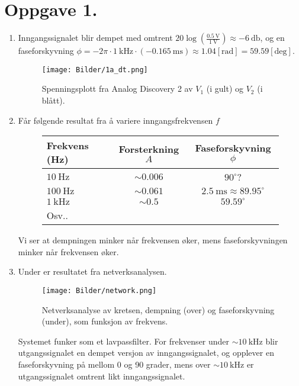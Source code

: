 \documentclass[a4paper,11pt,norsk]{article}
\begin{document}


\section*{Oppgave 1.}
\begin{enumerate}
    \item {
        Inngangssignalet blir dempet med omtrent $20\log{\left(\frac{\SI{0.5}{\volt}}{\SI{1}{\volt}}\right)} \approx \SI{-6}{\decibel}$, og 
        en faseforskyvning $\phi = -2\pi \cdot \SI{1}{\kilo\hertz} \cdot (-\SI{0.165}{\milli\s}) \approx 1.04[\text{rad}] = 59.59[\text{deg}]$.
     
        \begin{figure}[H]
            \centering
            \texttt{[image: Bilder/1a\_dt.png]}
            \caption{Spenningsplott fra Analog Discovery 2 av $V_1$ (i gult) og $V_2$ (i blått).}
        \end{figure}
    }
    \item {
        Får følgende resultat fra å variere inngangsfrekvensen $f$
        \begin{figure}[H]
            \centering
            \begin{tabular}{| l | c | c |}
                \hline
                Frekvens (Hz) & Forsterkning $A$ & Faseforskyvning $\phi$ \\
                \hline
                $\SI{10}{\hertz}$ & $\sim 0.006$ & $90^{\circ}$? \\ 
                \hline
                $\SI{100}{\hertz}$ & $\sim 0.061$ & $\SI{2.5}{\milli\s} \approx 89.95^{\circ}$\\ 
                \hline
                $\SI{1}{\kilo\hertz}$ & $\sim 0.5$ & $59.59^{\circ}$ \\ 
                \hline
                Osv.. & & \\
                \hline
            \end{tabular} 
        \end{figure}

        Vi ser at dempningen minker når frekvensen øker, mens faseforskyvningen minker når frekvensen øker.
    }
    \item {
        Under er resultatet fra netverksanalysen.
        \begin{figure}[H]
            \centering
            \texttt{[image: Bilder/network.png]}
            \caption{Netverksanalyse av kretsen, dempning (over) og faseforskyvning (under), som funksjon av frekvens.}
        \end{figure} 
        Systemet funker som et lavpassfilter. For frekvenser under $\sim \SI{10}{\kilo\hertz}$ blir utgangssignalet en dempet versjon av inngangssignalet,
        og opplever en faseforskyvning på mellom 0 og 90 grader, mens over $\sim \SI{10}{\kilo\hertz}$ er utgangssignalet omtrent likt inngangssignalet.
    }
\end{enumerate}
\end{document}
